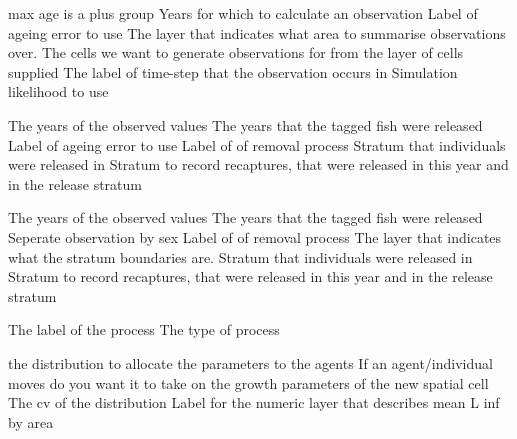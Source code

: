  {max age is a plus group}
 {Years for which to calculate an observation}
 {Label of ageing error to use}
 {The layer that indicates what area to summarise observations over.}
 {The cells we want to generate observations for from the layer of cells supplied}
 {The label of time-step that the observation occurs in}
 {Simulation likelihood to use}
\par\textbf{}\par
{} {The years of the observed values}
 {The years that the tagged fish were released}
 {Label of ageing error to use}
 {Label of of removal process}
 {Stratum that individuals were released in}
 {Stratum to record recaptures, that were released in this year and in the release stratum}
\par\textbf{}\par
{} {The years of the observed values}
 {The years that the tagged fish were released}
 {Seperate observation by sex}
 {Label of of removal process}
 {The layer that indicates what the stratum boundaries are.}
 {Stratum that individuals were released in}
 {Stratum to record recaptures, that were released in this year and in the release stratum}
\par\par
{} {The label of the process}
 {The type of process}
\par\textbf{}\par
\par\textbf{}\par
{} {the distribution to allocate the parameters to the agents}
 {If an agent/individual moves do you want it to take on the growth parameters of the new spatial cell}
 {The cv of the distribution}
 {Label for the numeric layer that describes mean L inf by area}
